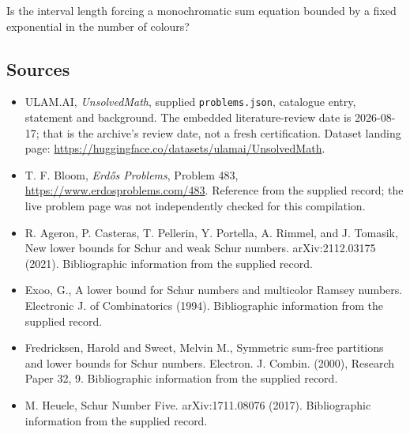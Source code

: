 \documentclass[11pt,a4paper]{article}
\begin{document}
Is the interval length forcing a monochromatic sum equation bounded by a fixed exponential in the number of colours?

\subsection{Sources}

{\small

\begin{itemize}

\item[\hypertarget{source:statement:1}{S1}] ULAM.AI, \emph{UnsolvedMath}, supplied \texttt{problems.json}, catalogue entry, statement and background. The embedded literature-review date is 2026-08-17; that is the archive’s review date, not a fresh certification. Dataset landing page: \url{https://huggingface.co/datasets/ulamai/UnsolvedMath}.

\item[\hypertarget{source:statement:2}{S2}] T. F. Bloom, \emph{Erdős Problems}, Problem 483, \url{https://www.erdosproblems.com/483}. Reference from the supplied record; the live problem page was not independently checked for this compilation.

\item[\hypertarget{source:statement:3}{S3}] R. Ageron, P. Casteras, T. Pellerin, Y. Portella, A. Rimmel, and J. Tomasik, New lower bounds for Schur and weak Schur numbers. arXiv:2112.03175 (2021). Bibliographic information from the supplied record.

\item[\hypertarget{source:statement:4}{S4}] Exoo, G., A lower bound for Schur numbers and multicolor Ramsey numbers. Electronic J. of Combinatorics (1994). Bibliographic information from the supplied record.

\item[\hypertarget{source:statement:5}{S5}] Fredricksen, Harold and Sweet, Melvin M., Symmetric sum-free partitions and lower bounds for {S}chur numbers. Electron. J. Combin. (2000), Research Paper 32, 9. Bibliographic information from the supplied record.

\item[\hypertarget{source:statement:6}{S6}] M. Heuele, Schur Number Five. arXiv:1711.08076 (2017). Bibliographic information from the supplied record.

\end{itemize}

}

\label{end:statement}
\end{document}

